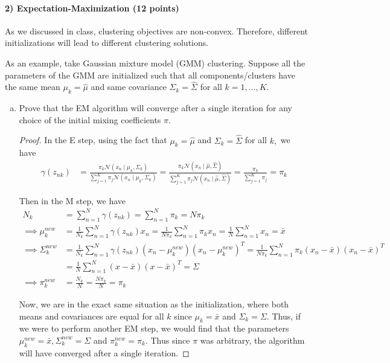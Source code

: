 \documentclass{article}
\begin{document}
\newpage
\paragraph{2) Expectation-Maximization (12 points)} 

As we discussed in class, clustering objectives are non-convex. Therefore, different initializations will lead to different clustering solutions.

As an example, take Gaussian mixture model (GMM) clustering. Suppose all the parameters of the GMM are initialized such that all components/clusters have the same mean $\mu_k=\hat{\mu}$ and same covariance $\Sigma_k=\hat{\Sigma}$ for all $k=1,\ldots,K$.
\begin{enumerate}[(a)]
	\item Prove that the EM
		algorithm will converge after a single iteration for any choice of the initial mixing coefficients $\pi$.
		\begin{proof}
			In the E step, using the fact that $\mu_k=\hat\mu$ and $\Sigma_k=\hat\Sigma$ for all $k,$ we have
			\begin{align*}
				\gamma(z_{nk}) &= \frac{\pi_k \mathcal N\left(x_n\mid \mu_k, \Sigma_k\right)}{\sum_{j=1}^{K}\pi_j \mathcal N\left( x_n\mid \mu_k, \Sigma_k \right)} = \frac{\pi_k \mathcal N\left( x_n\mid \hat\mu, \hat\Sigma \right)}{\sum_{j=1}^{K} \pi_j \mathcal N\left( x_n\mid \hat\mu, \hat\Sigma \right)} = \frac{\pi_k}{\sum_{j=1}^{K}\pi_j} = \pi_k
			\end{align*}

			Then in the M step, we have
			\begin{align*}
				N_k &= \sum_{n=1}^{N} \gamma(z_{nk}) = \sum_{n=1}^{N} \pi_k = N\pi_k \\
				\implies \mu_k^{new} &= \frac{1}{N_k} \sum_{n=1}^{N} \gamma(z_{nk}) x_n = \frac{1}{N\pi_k} \sum_{n=1}^{N} \pi_k x_n = \frac{1}{N} \sum_{n=1}^{N} x_n = \bar x \\
				\implies\Sigma_k^{new} &= \frac{1}{N_k} \sum_{n=1}^{N} \gamma(z_{nk}) \left( x_n-\mu_k^{new} \right)\left( x_n-\mu_k^{new} \right)^T = \frac{1}{N\pi_k} \sum_{n=1}^{N} \pi_k \left( x_n- \bar x\right) \left( x_n-\bar x \right)^T \\
				&= \frac{1}{N} \sum_{n=1}^{N} \left( x-\bar x \right)\left( x-\bar x \right)^T = \Sigma \\
				\implies \pi_k^{new} &= \frac{N_k}{N} = \frac{N\pi_k}{N} = \pi_k
			\end{align*}

			Now, we are in the exact same situation as the initialization, where both means and covariances are equal for all $k$ since $\mu_k=\bar x$ and $\Sigma_k=\Sigma.$ Thus, if we were to perform another EM step, we would find that the parameters $\mu_k^{new} = \bar x, \Sigma_k^{new}=\Sigma$ and $\pi_k^{new} = \pi_k.$ Thus since $\pi$ was arbitrary, the algorithm will have converged after a single iteration.
		\end{proof}


\end{enumerate}
\end{document}
